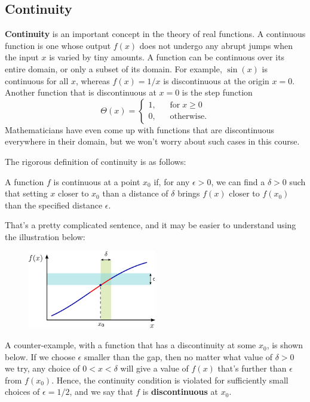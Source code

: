 \documentclass[10pt,a4paper]{article}
\begin{document}
\subsection{Continuity}

\textbf{Continuity} is an important concept in the theory of real
functions. A continuous function is one whose output $f(x)$ does not
undergo any abrupt jumps when the input $x$ is varied by tiny amounts.
A function can be continuous over its entire domain, or only a subset of
its domain. For example, $\sin(x)$ is continuous for all $x$,
whereas $f(x) = 1/x$ is discontinuous at the origin $x = 0$. Another
function that is discontinuous at $x=0$ is the step function
\[\Theta(x) = \left\{\begin{array}{ll} 1, &\;\;\;\textrm{for} \; x \ge 0\\ 0,&\;\;\; \textrm{otherwise.}\end{array}\right.\]
Mathematicians have even come up with functions that are discontinuous
everywhere in their domain, but we won't worry about such cases in this
course.

The rigorous definition of continuity is as follows:

\begin{framed}\noindent
A function $f$ is continuous at a point $x_0$ if, for any
$\epsilon > 0$, we can find a $\delta > 0$ such that setting $x$
closer to $x_0$ than a distance of $\delta$ brings $f(x)$ closer
to $f(x_0)$ than the specified distance $\epsilon$.
\end{framed}

\noindent
That's a pretty complicated sentence, and it may be easier to understand
using the illustration below:

\begin{figure}[h]
  \centering\includegraphics[width=0.5\textwidth]{continuity}
\end{figure}
    
A counter-example, with a function that has a discontinuity at some
$x_0$, is shown below. If we choose $\epsilon$ smaller than the gap,
then no matter what value of $\delta > 0$ we try, any choice of
$0 < x < \delta$ will give a value of $f(x)$ that's further than
$\epsilon$ from $f(x_0)$. Hence, the continuity condition is
violated for sufficiently small choices of $\epsilon = 1/2$, and we
say that $f$ is \textbf{discontinuous} at $x_0$.
\end{document}
